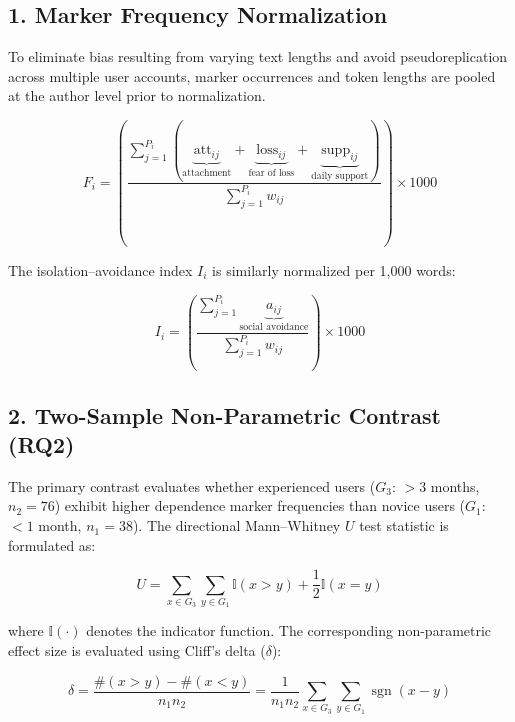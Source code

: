 
\subsection*{1. Marker Frequency Normalization}

To eliminate bias resulting from varying text lengths and avoid pseudoreplication across multiple user accounts, marker occurrences and token lengths are pooled at the author level prior to normalization.

\begin{equation}
F_i = \left( \frac{\sum_{j=1}^{P_i} \left( \underbrace{\text{att}_{ij}}_{\text{attachment}} + \underbrace{\text{loss}_{ij}}_{\text{fear of loss}} + \underbrace{\text{supp}_{ij}}_{\text{daily support}} \right)}{\sum_{j=1}^{P_i} w_{ij}} \right) \times 1000
\label{eq:f_marker}
\end{equation}

The isolation--avoidance index $I_i$ is similarly normalized per 1,000 words:

\begin{equation}
I_i = \left( \frac{\sum_{j=1}^{P_i} \underbrace{a_{ij}}_{\text{social avoidance}}}{\sum_{j=1}^{P_i} w_{ij}} \right) \times 1000
\label{eq:i_marker}
\end{equation}

\subsection*{2. Two-Sample Non-Parametric Contrast (RQ2)}

The primary contrast evaluates whether experienced users ($G_3$: $>3$ months, $n_2 = 76$) exhibit higher dependence marker frequencies than novice users ($G_1$: $<1$ month, $n_1 = 38$). The directional Mann--Whitney $U$ test statistic is formulated as:

\begin{equation}
U = \sum_{x \in G_3} \sum_{y \in G_1} \mathbb{I}(x > y) + \frac{1}{2}\mathbb{I}(x = y)
\label{eq:mwu}
\end{equation}

\noindent where $\mathbb{I}(\cdot)$ denotes the indicator function. The corresponding non-parametric effect size is evaluated using Cliff's delta ($\delta$):

\begin{equation}
\delta = \frac{\# (x > y) - \# (x < y)}{n_1 n_2} = \frac{1}{n_1 n_2} \sum_{x \in G_3} \sum_{y \in G_1} \operatorname{sgn}(x - y)
\label{eq:cliffs_delta}
\end{equation}

